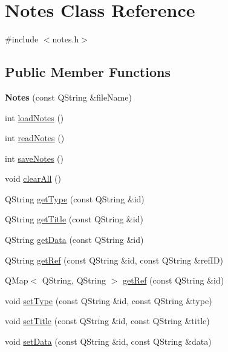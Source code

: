 \hypertarget{classNotes}{
\section{Notes Class Reference}
\label{classNotes}
}


{\ttfamily \#include $<$notes.h$>$}\subsection*{Public Member Functions}
\begin{DoxyCompactItemize}
\item 
\hypertarget{classNotes_a04a24963382268eddd6ad09387fc0958}{
{\bfseries Notes} (const QString \&fileName)}
\label{classNotes_a04a24963382268eddd6ad09387fc0958}

\item 
int \hyperlink{classNotes_a91273d4a534e6426adb63bef043b4dbc}{loadNotes} ()
\item 
int \hyperlink{classNotes_aa47d6a7af0c2674fe6d3372280755d5b}{readNotes} ()
\item 
int \hyperlink{classNotes_af76c3652cd25371b7233eb84079b39a0}{saveNotes} ()
\item 
void \hyperlink{classNotes_a9abdabc242dc6340e4b5157fb3620ee0}{clearAll} ()
\item 
QString \hyperlink{classNotes_a8fe0144e2c4f5566f1ba03545dba94e4}{getType} (const QString \&id)
\item 
QString \hyperlink{classNotes_a784bbf981f20f1ffc9a07c32d1f2ad2f}{getTitle} (const QString \&id)
\item 
QString \hyperlink{classNotes_a3a60de9ba1c1fc3e1cd118ca50443f02}{getData} (const QString \&id)
\item 
QString \hyperlink{classNotes_ae1fdbee2ecd121c81c7eb1c48404094d}{getRef} (const QString \&id, const QString \&refID)
\item 
QMap$<$ QString, QString $>$ \hyperlink{classNotes_a2452989d91340c9158210421a5d16362}{getRef} (const QString \&id)
\item 
void \hyperlink{classNotes_a2e471d6614087c21ad4265596387312c}{setType} (const QString \&id, const QString \&type)
\item 
void \hyperlink{classNotes_ace9ed14dfa9f9ca785070b70a06deec3}{setTitle} (const QString \&id, const QString \&title)
\item 
void \hyperlink{classNotes_a176683f801c998ff85f667947c41c7d9}{setData} (const QString \&id, const QString \&data)
\item 

\end{DoxyCompactItemize}
